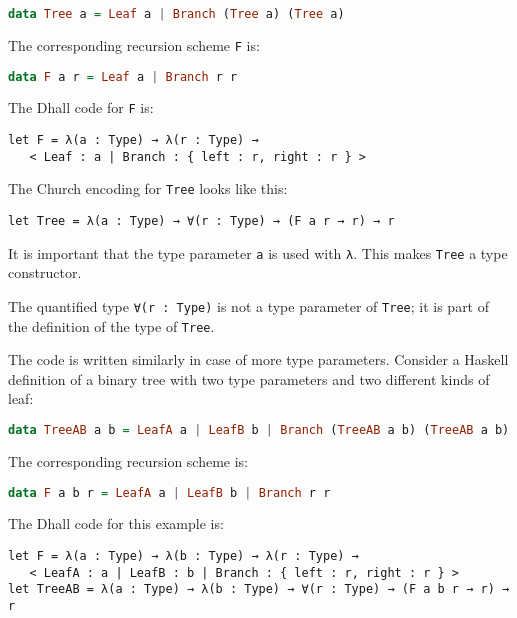 \begin{lstlisting}[language=Haskell]
data Tree a = Leaf a | Branch (Tree a) (Tree a)
\end{lstlisting}


The corresponding recursion scheme \lstinline!F! is:


\begin{lstlisting}[language=Haskell]
data F a r = Leaf a | Branch r r
\end{lstlisting}


The Dhall code for \lstinline!F! is:


\begin{lstlisting}[language=Dhall]
let F = λ(a : Type) → λ(r : Type) →
   < Leaf : a | Branch : { left : r, right : r } >
\end{lstlisting}


The Church encoding for \lstinline!Tree! looks like this:


\begin{lstlisting}[language=Dhall]
let Tree = λ(a : Type) → ∀(r : Type) → (F a r → r) → r
\end{lstlisting}


It is important that the type parameter \lstinline!a! is used with \lstinline!λ!.
This makes \lstinline!Tree! a type constructor.


The quantified type \lstinline!∀(r : Type)! is not a type parameter of \lstinline!Tree!; it is part of the definition of the type of \lstinline!Tree!.


The code is written similarly in case of more type parameters.
Consider a Haskell definition of a binary tree with two type parameters and two different kinds of leaf:


\begin{lstlisting}[language=Haskell]
data TreeAB a b = LeafA a | LeafB b | Branch (TreeAB a b) (TreeAB a b)
\end{lstlisting}


The corresponding recursion scheme is:


\begin{lstlisting}[language=Haskell]
data F a b r = LeafA a | LeafB b | Branch r r
\end{lstlisting}


The Dhall code for this example is:


\begin{lstlisting}[language=Dhall]
let F = λ(a : Type) → λ(b : Type) → λ(r : Type) →
   < LeafA : a | LeafB : b | Branch : { left : r, right : r } >
let TreeAB = λ(a : Type) → λ(b : Type) → ∀(r : Type) → (F a b r → r) → r
\end{lstlisting}



